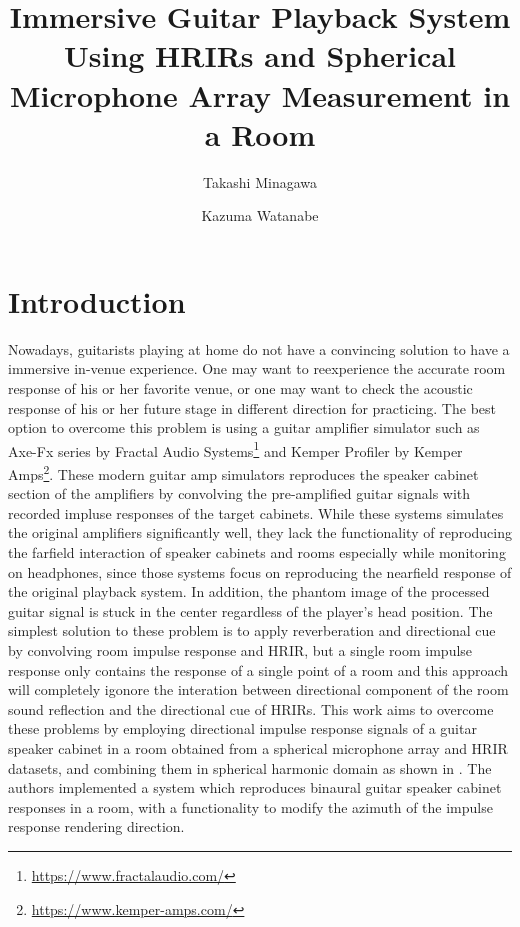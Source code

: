 \documentclass[convention,e-brief]{aesconf-current}
\title{ Immersive Guitar Playback System Using HRIRs and Spherical Microphone Array Measurement in a Room}
\author[1]{Takashi Minagawa}
\author[1]{Kazuma Watanabe}
\affil[1]{Graduate School of Design, Kyushu University}
\begin{document}

\section{Introduction}

Nowadays, guitarists playing at home do not have a convincing solution to have a immersive in-venue experience.
One may want to reexperience the accurate room response of his or her favorite venue, or one may want to check the acoustic response of his or her future stage in different direction for practicing.
The best option to overcome this problem is using a guitar amplifier simulator such as Axe-Fx series by Fractal Audio Systems\footnote{\url{https://www.fractalaudio.com/}} and Kemper Profiler by Kemper Amps\footnote{\url{https://www.kemper-amps.com/}}.
These modern guitar amp simulators reproduces the speaker cabinet section of the amplifiers by convolving the pre-amplified guitar signals with recorded impluse responses of the target cabinets.
While these systems simulates the original amplifiers significantly well, they lack the functionality of reproducing the farfield interaction of speaker cabinets and rooms especially while monitoring on headphones, since those systems focus on reproducing the nearfield response of the original playback system.
In addition, the phantom image of the processed guitar signal is stuck in the center regardless of the player's head position.
The simplest solution to these problem is to apply reverberation and directional cue by convolving room impulse response and HRIR, but a single room impulse response only contains the response of a single point of a room and this approach will completely igonore the interation between directional component of the room sound reflection and the directional cue of HRIRs.
This work aims to overcome these problems by employing directional impulse response signals of a guitar speaker cabinet in a room obtained from a spherical microphone array and HRIR datasets, and combining them in spherical harmonic domain as shown in \cite{Andersson2017-qg}.
The authors implemented a system which reproduces binaural guitar speaker cabinet responses in a room, with a functionality to modify the azimuth of the impulse response rendering direction.
\end{document}
